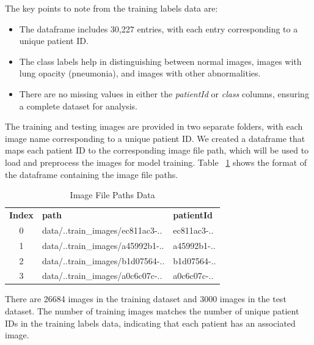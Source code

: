 The key points to note from the training labels data are:
\begin{itemize}
    \item The dataframe includes 30,227 entries, with each entry corresponding to a unique patient ID.
    \item The class labels help in distinguishing between normal images, images with lung opacity (pneumonia), and images with other abnormalities.
    \item There are no missing values in either the \emph{patientId} or \emph{class} columns, ensuring a complete dataset for analysis.
\end{itemize}

The training and testing images are provided in two separate folders, with each image name corresponding to a unique patient ID. We created a dataframe that maps each patient ID to the corresponding image file path, which will be used to load and preprocess the images for model training. Table ~\ref{tab:cha-2 table3} shows the format of the dataframe containing the image file paths.

\begin{table}[h!]
    \centering
    \caption{Image File Paths Data}
    \label{tab:cha-2 table3}
    \begin{adjustbox}{max width=\textwidth}
        \begin{tabularx}{\textwidth}{c|X|X}
            \rowcolor{gray!20}
            \textbf{Index} & \textbf{path}                    & \textbf{patientId} \\
            0              & data/..train\_images/ec811ac3-.. & ec811ac3-..        \\
            1              & data/..train\_images/a45992b1-.. & a45992b1-..        \\
            2              & data/..train\_images/b1d07564-.. & b1d07564-..        \\
            3              & data/..train\_images/a0c6c07c-.. & a0c6c07c-..        \\
        \end{tabularx}
    \end{adjustbox}
\end{table}

There are 26684 images in the training dataset and 3000 images in the test dataset. The number of training images matches the number of unique patient IDs in the training labels data, indicating that each patient has an associated image.

